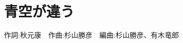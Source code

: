 \section{青空が違う}

\begin{center}
    \scriptsize{
        作詞:秋元康　作曲:杉山勝彦　編曲:杉山勝彦、有木竜郎
    }
\end{center}

\vspace{0.7em}

\begin{Parallel}[c]{0.47\textwidth}{0.47\textwidth}

\ParallelLText{
    \footnotesize{
        
    }
}

\ParallelRText{
    \footnotesize{
        
    }
}

\end{Parallel}

